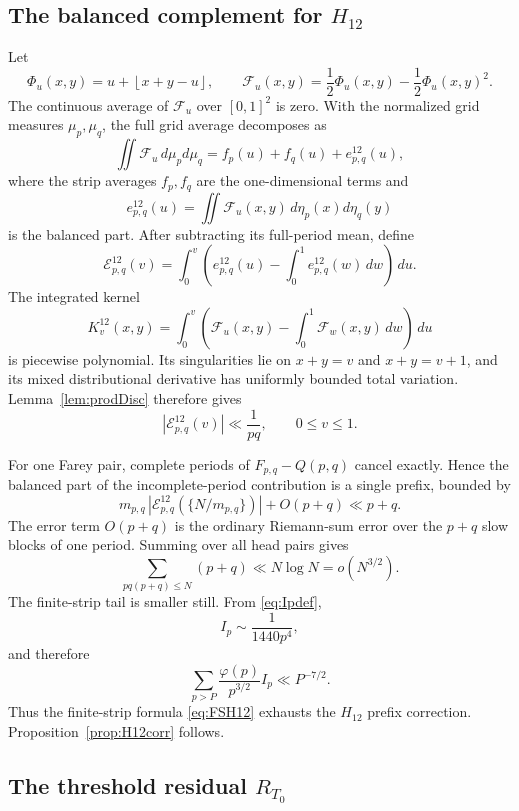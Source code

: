 \documentclass[a4paper,american,11pt]{amsart}
\theoremstyle{plain}
\theoremstyle{definition}
\newcommand{\dd}{\,d}
\newcommand{\floor}[1]{\left\lfloor #1\right\rfloor}
\begin{document}
\subsection{The balanced complement for \(H_{12}\)}

Let
\[
 \Phi_u(x,y)=u+\floor{x+y-u},
 \qquad
 \mathcal F_u(x,y)=\frac12\Phi_u(x,y)-\frac12\Phi_u(x,y)^2.
\]
The continuous average of \(\mathcal F_u\) over \([0,1]^2\) is zero.  With the
normalized grid measures \(\mu_p,\mu_q\), the full grid average decomposes as
\[
 \iint \mathcal F_u\,d\mu_p d\mu_q=f_p(u)+f_q(u)+e^{12}_{p,q}(u),
\]
where the strip averages \(f_p,f_q\) are the one-dimensional terms and
\begin{equation}\label{eq:e12}
 e^{12}_{p,q}(u)=\iint \mathcal F_u(x,y)\,d\eta_p(x)d\eta_q(y)
\end{equation}
is the balanced part.  After subtracting its full-period mean, define
\begin{equation}\label{eq:E12}
 \mathcal E^{12}_{p,q}(v)=
 \int_0^v\left(e^{12}_{p,q}(u)-\int_0^1e^{12}_{p,q}(w)\dd w\right)\dd u.
\end{equation}
The integrated kernel
\[
 K^{12}_v(x,y)=\int_0^v\left(\mathcal F_u(x,y)-\int_0^1\mathcal F_w(x,y)\dd w\right)\dd u
\]
is piecewise polynomial.  Its singularities lie on \(x+y=v\) and \(x+y=v+1\),
and its mixed distributional derivative has uniformly bounded total
variation.  Lemma~\ref{lem:prodDisc} therefore gives
\begin{equation}\label{eq:E12bound}
 |\mathcal E^{12}_{p,q}(v)|\ll \frac1{pq},
 \qquad 0\le v\le1.
\end{equation}

For one Farey pair, complete periods of \(F_{p,q}-Q(p,q)\) cancel exactly.
Hence the balanced part of the incomplete-period contribution is a single
prefix, bounded by
\[
 m_{p,q}\,|\mathcal E^{12}_{p,q}(\{N/m_{p,q}\})|+O(p+q)
 \ll p+q.
\]
The error term \(O(p+q)\) is the ordinary Riemann-sum error over the \(p+q\)
slow blocks of one period.  Summing over all head pairs gives
\[
 \sum_{pq(p+q)\le N}(p+q)
 \ll N\log N=o(N^{3/2}).
\]
The finite-strip tail is smaller still.  From \eqref{eq:Ipdef},
\[
 I_p\sim \frac{1}{1440p^4},
\]
and therefore
\[
 \sum_{p>P}\frac{\varphi(p)}{p^{3/2}}I_p\ll P^{-7/2}.
\]
Thus the finite-strip formula \eqref{eq:FSH12} exhausts the \(H_{12}\) prefix
correction.  Proposition~\ref{prop:H12corr} follows.

\subsection{The threshold residual \(R_{T_0}\)}
\end{document}
